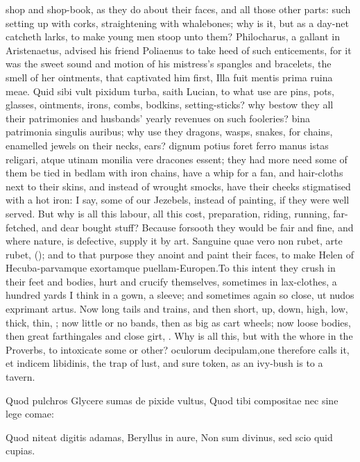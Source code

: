 shop and shop-book, as they do about their faces, and all those other
parts: such setting up with corks, straightening with whalebones; why
is it, but as a day-net catcheth larks, to make young men stoop unto
them? Philocharus, a gallant in Aristenaetus, advised his friend
Poliaenus to take heed of such enticements, for it was the sweet
sound and motion of his mistress's spangles and bracelets, the smell of
her ointments, that captivated him first, Illa fuit mentis prima ruina
meae. Quid sibi vult pixidum turba, saith Lucian, to what use are
pins, pots, glasses, ointments, irons, combs, bodkins, setting-sticks?
why bestow they all their patrimonies and husbands' yearly revenues on
such fooleries? bina patrimonia singulis auribus; why use they
dragons, wasps, snakes, for chains, enamelled jewels on their necks,
ears? dignum potius foret ferro manus istas religari, atque utinam
monilia vere dracones essent; they had more need some of them be tied
in bedlam with iron chains, have a whip for a fan, and hair-cloths next
to their skins, and instead of wrought smocks, have their cheeks
stigmatised with a hot iron: I say, some of our Jezebels, instead of
painting, if they were well served. But why is all this labour, all
this cost, preparation, riding, running, far-fetched, and dear bought
stuff? Because forsooth they would be fair and fine, and where
nature, is defective, supply it by art. Sanguine quae vero non
rubet, arte rubet, (\Ovid); and to that purpose they anoint and paint
their faces, to make Helen of Hecuba-parvamque exortamque
puellam-Europen.To this intent they crush in their feet and
bodies, hurt and crucify themselves, sometimes in lax-clothes, a
hundred yards I think in a gown, a sleeve; and sometimes again so
close, ut nudos exprimant artus. Now long tails and trains, and
then short, up, down, high, low, thick, thin, \etc{}; now little or no
bands, then as big as cart wheels; now loose bodies, then great
farthingales and close girt, \etc{}. Why is all this, but with the whore in
the Proverbs, to intoxicate some or other? oculorum decipulam,one
therefore calls it, et indicem libidinis, the trap of lust, and sure
token, as an ivy-bush is to a tavern.

Quod pulchros Glycere sumas de pixide vultus,
Quod tibi compositae nec sine lege comae:

Quod niteat digitis adamas, Beryllus in aure,
Non sum divinus, sed scio quid cupias.


